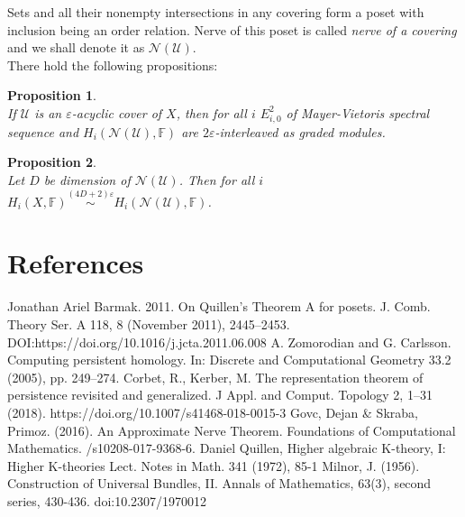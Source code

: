 \documentclass[a4paper, 12pt]{article}
\newtheorem{proposition}{Proposition}
\theoremstyle{definition}
\theoremstyle{remark}
\newcommand{\define}[1]{{\textit{#1}}}
\begin{document}
Sets and all their nonempty intersections in any covering form a poset with inclusion being an order relation. Nerve of this poset is called \define{nerve of a covering} and we shall denote it as $\mathcal{N}(\mathcal{U})$.\\

There hold the following propositions:

\begin{proposition} {\cite[Corollary 5.2]{GS16}}\\
  If $\mathcal{U}$ is an $\varepsilon$-acyclic cover of $X$, then for all $i$ $E^2_{i,0}$ of Mayer-Vietoris spectral sequence and $H_{i}(\mathcal{N}(\mathcal{U}),\mathbb{F})$ are $2\varepsilon$-interleaved as graded modules.
\end{proposition}

\begin{proposition} {\cite[Theorem 7.1]{GS16}}\\
  Let $D$ be dimension of $\mathcal{N}(\mathcal{U})$. Then for all $i$ $H_i(X,\mathbb{F}) \stackrel{(4D+2)\varepsilon}{\sim} H_i(\mathcal{N}(\mathcal{U}),\mathbb{F})$.
\end{proposition}

\section{References}

\begin{enumerate}
  Jonathan Ariel Barmak. 2011.
  \newblock On Quillen’s Theorem A for posets.
  \newblock J. Comb. Theory Ser. A 118, 8 (November 2011), 2445–2453.
  \newblock DOI:https://doi.org/10.1016/j.jcta.2011.06.008
  A. Zomorodian and G. Carlsson.
  \newblock Computing persistent homology.
  \newblock In: Discrete and Computational Geometry 33.2 (2005), pp. 249–274.
  Corbet, R., Kerber, M.
  \newblock The representation theorem of persistence revisited and generalized.
  \newblock J Appl. and Comput. Topology 2, 1–31 (2018).
  \newblock https://doi.org/10.1007/s41468-018-0015-3
  Govc, Dejan \& Skraba, Primoz. (2016).
  \newblock An Approximate Nerve Theorem.
  \newblock Foundations of Computational Mathematics.
  /s10208-017-9368-6.
  Daniel Quillen,
  \newblock Higher algebraic K-theory, I: Higher K-theories Lect.
  \newblock Notes in Math. 341 (1972), 85-1
  Milnor, J. (1956).
  \newblock Construction of Universal Bundles, II.
  \newblock Annals of Mathematics, 63(3), second series, 430-436.
  \newblock doi:10.2307/1970012
\end{enumerate}
\end{document}

